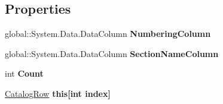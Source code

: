 \subsection*{Properties}
\begin{DoxyCompactItemize}
\item 
global\+::\+System.\+Data.\+Data\+Column {\bfseries Numbering\+Column}\hypertarget{class_products_1_1_data_1_1ds_sage_1_1_catalog_data_table_a0bb992bb78e05bd2498ce5713cf3ca80}{}\label{class_products_1_1_data_1_1ds_sage_1_1_catalog_data_table_a0bb992bb78e05bd2498ce5713cf3ca80}

\item 
global\+::\+System.\+Data.\+Data\+Column {\bfseries Section\+Name\+Column}\hypertarget{class_products_1_1_data_1_1ds_sage_1_1_catalog_data_table_aa0970c664ca1aa88f99462b0f17e9f01}{}\label{class_products_1_1_data_1_1ds_sage_1_1_catalog_data_table_aa0970c664ca1aa88f99462b0f17e9f01}

\item 
int {\bfseries Count}\hypertarget{class_products_1_1_data_1_1ds_sage_1_1_catalog_data_table_a93993eec82b415ec5d7086e6d8699876}{}\label{class_products_1_1_data_1_1ds_sage_1_1_catalog_data_table_a93993eec82b415ec5d7086e6d8699876}

\item 
\hyperlink{class_products_1_1_data_1_1ds_sage_1_1_catalog_row}{Catalog\+Row} {\bfseries this\mbox{[}int index\mbox{]}}\hypertarget{class_products_1_1_data_1_1ds_sage_1_1_catalog_data_table_a26260981d711530e6208b6c99881260f}{}\label{class_products_1_1_data_1_1ds_sage_1_1_catalog_data_table_a26260981d711530e6208b6c99881260f}

\end{DoxyCompactItemize}
